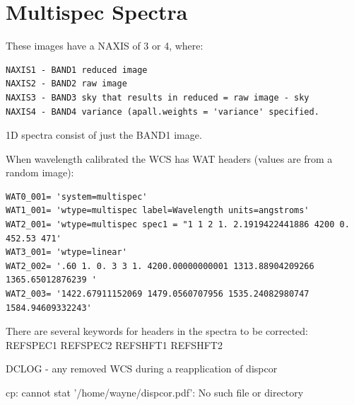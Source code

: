 
\renewcommand{\footerfilename}{MultiSpec.tex}

\section{Multispec Spectra}

These images have a NAXIS of 3 or 4, where:

\begingroup \fontsize{10pt}{10pt}
\selectfont
\begin{verbatim} 
NAXIS1 - BAND1 reduced image
NAXIS2 - BAND2 raw image
NAXIS3 - BAND3 sky that results in reduced = raw image - sky
NAXIS4 - BAND4 variance (apall.weights = 'variance' specified.
\end{verbatim}
\endgroup

1D spectra consist of just the BAND1 image.

When wavelength calibrated the WCS has WAT headers (values are from
a random image):

\begingroup \fontsize{10pt}{10pt}
\selectfont
\begin{verbatim} 
WAT0_001= 'system=multispec'
WAT1_001= 'wtype=multispec label=Wavelength units=angstroms'
WAT2_001= 'wtype=multispec spec1 = "1 1 2 1. 2.1919422441886 4200 0. 452.53 471'
WAT3_001= 'wtype=linear'
WAT2_002= '.60 1. 0. 3 3 1. 4200.00000000001 1313.88904209266 1365.65012876239 '
WAT2_003= '1422.67911152069 1479.0560707956 1535.24082980747 1584.94609332243'
\end{verbatim}
\endgroup

There are several keywords for headers in the spectra to be corrected:
REFSPEC1
REFSPEC2
REFSHFT1
REFSHFT2



DCLOG - any removed WCS during a reapplication of dispcor

cp: cannot stat '/home/wayne/dispcor.pdf': No such file or directory
